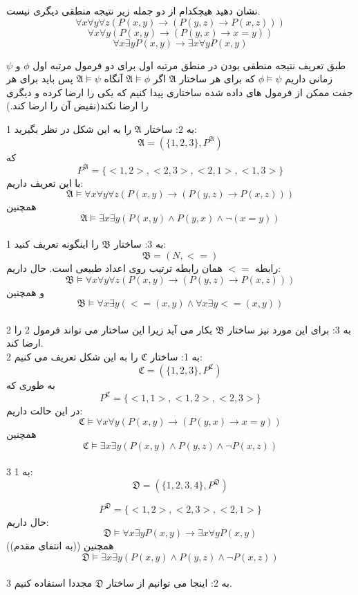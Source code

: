 نشان دهید هیچکدام از دو جمله زیر نتیجه منطقی دیگری نیست.
  \[\forall x\forall y\forall z(P(x,y)\rightarrow(P(y,z)\rightarrow P(x,z)))\]
  \[\forall x\forall y(P(x,y)\rightarrow(P(y,x)\rightarrow x=y))\]
  \[\forall x\exists yP(x,y)\rightarrow\exists x\forall yP(x,y)\]
\begin{ans}
طبق تعریف نتیجه منطقی بودن در منطق مرتبه اول برای دو فرمول مرتبه اول 
	$\phi$
	و
	$\psi$
	زمانی داریم
	$\phi\models\psi$
	که برای هر ساختار 
	$\mathfrak{A}$
	اگر 
	$\mathfrak{A}\models\phi$
	آنگاه
	$\mathfrak{A}\models\psi$
	پس باید برای هر جفت ممکن از فرمول های داده شده ساختاری پیدا کنیم که یکی را ارضا کرده و دیگری را ارضا نکند(نقیض آن را ارضا کند.)
	
	
	
	1 به 2:
	ساختار 
	$\mathfrak{A}$
	را به این شکل در نظر بگیرید:
	\[\mathfrak{A} = (\{1,2,3\},P^{\mathfrak{A}})\]
	که 
	\[P^{\mathfrak{A}} = \{<1,2>,<2,3>,<2,1>,<1,3>\}\]
	با این تعریف داریم:
	\[\mathfrak{A}\models\forall x\forall y\forall z(P(x,y)\rightarrow(P(y,z)\rightarrow P(x,z)))\]
	همچنین
	\[\mathfrak{A}\models\exists x\exists y(P(x,y)\land P(y,x)\land\neg(x=y))\]
	\\
	1 به 3:
	ساختار 
	$\mathfrak{B}$
	را اینگونه تعریف کنید:
	\[\mathfrak{B} = (N,<=)\]
	رابطه 
	$<=$
	همان رابطه ترتیب روی اعداد طبیعی است. حال داریم:
	\[\mathfrak{B}\models\forall x\forall y\forall z(P(x,y)\rightarrow(P(y,z)\rightarrow P(x,z)))\]
	و همچنین 
	\[\mathfrak{B}\models\forall x\exists y(<=(x,y)\land\forall x\exists y <=(x,y))\]
	\\
	2 به 3: برای این مورد نیز ساختار 
	$\mathfrak{B}$
	بکار می آید زیرا این ساختار می تواند فرمول 2 را ارضا کند.
	\\
	2 به 1: ساختار 
	$\mathfrak{C}$
	را به این شکل تعریف می کنیم:
	\[\mathfrak{C} = (\{1,2,3\},P^{\mathfrak{C}})\]
	به طوری که 
	\[P^{\mathfrak{C}} = \{<1,1>, <1,2>, <2,3>\}\]
	در این حالت داریم:
	\[\mathfrak{C}\models\forall x\forall y(P(x,y)\rightarrow(P(y,x)\rightarrow x=y))\]
	همچنین 
	\[\mathfrak{C}\models\exists x\exists y(P(x,y)\land P(y,z)\land\neg P(x,z))\]
	\\
	3 به 1:
	\[\mathfrak{D} = (\{1,2,3,4\},P^{\mathfrak{D}})\]
	
	\[P^{\mathfrak{D}} = \{<1,2>, <2,3>, <2,1>\}\]
	حال داریم:
	\[\mathfrak{D}\models\forall x\exists yP(x,y)\rightarrow\exists x\forall yP(x,y)\]((به انتفای مقدم))
	همچنین
	\[\mathfrak{D}\models\exists x\exists y(P(x,y)\land P(y,z)\land\neg P(x,z))\]
	\\
	3 به 2: اینجا می توانیم از ساختار 
	$\mathfrak{D}$
	مجددا استفاده کنیم.
\end{ans}
